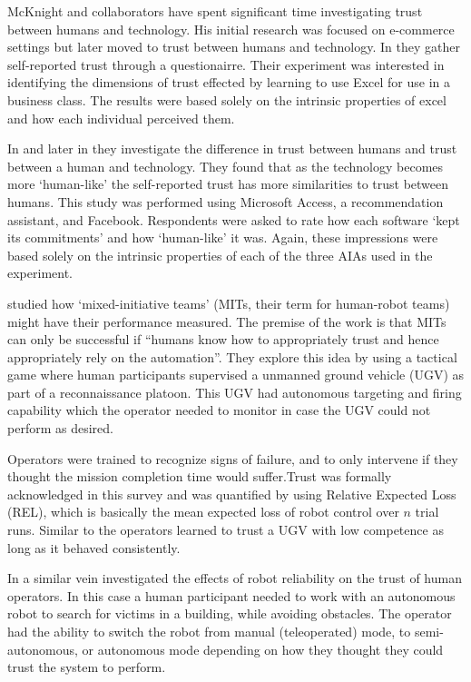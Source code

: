 McKnight and collaborators have spent significant time investigating trust between humans and technology. His initial research was focused on e-commerce settings but later moved to trust between humans and technology. In \cite{Mcknight2011-gv} they gather self-reported trust through a questionairre. Their experiment was interested in identifying the dimensions of trust effected by learning to use Excel for use in a business class. The results were based solely on the intrinsic properties of excel and how each individual perceived them.

In \cite{Lankton2008-ct} and later in \cite{Tripp2011-cq} they investigate the difference in trust between humans and trust between a human and technology. They found that as the technology becomes more `human-like' the self-reported trust has more similarities to trust between humans. This study was performed using Microsoft Access, a recommendation assistant, and Facebook. Respondents were asked to rate how each software `kept its commitments' and how `human-like' it was. Again, these impressions were based solely on the intrinsic properties of each of the three AIAs used in the experiment.

\citet{Freedy2007-sg} studied how `mixed-initiative teams' (MITs, their term for human-robot teams) might have their performance measured. The premise of the work is that MITs can only be successful if ``humans know how to appropriately trust and hence appropriately rely on the automation''. They explore this idea by using a tactical game where human participants supervised a unmanned ground vehicle (UGV) as part of a reconnaissance platoon. This UGV had autonomous targeting and firing capability which the operator needed to monitor in case the UGV could not perform as desired.

Operators were trained to recognize signs of failure, and to only intervene if they thought the mission completion time would suffer.Trust was formally acknowledged in this survey and was quantified by using Relative Expected Loss (REL), which is basically the mean expected loss of robot control over $n$ trial runs. Similar to \cite{Muir1996-gt} the operators learned to trust a UGV with low competence as long as it behaved consistently.

In a similar vein \citet{Desai2012-rc} investigated the effects of robot reliability on the trust of human operators. In this case a human participant needed to work with an autonomous robot to search for victims in a building, while avoiding obstacles. The operator had the ability to switch the robot from manual (teleoperated) mode, to semi-autonomous, or autonomous mode depending on how they thought they could trust the system to perform.

